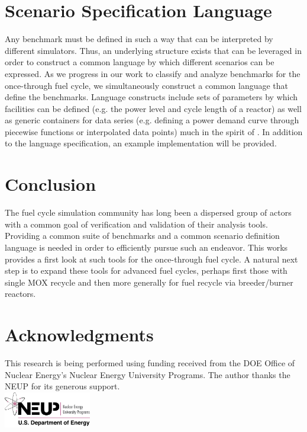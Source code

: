 \documentclass{anstrans}
\begin{document}
\section{Scenario Specification Language}
Any benchmark must be defined in such a way that can be interpreted by
different simulators. Thus, an underlying structure exists that can be
leveraged in order to construct a common language by which different
scenarios can be expressed. As we progress in our work to classify and
analyze benchmarks for the once-through fuel cycle, we simultaneously
construct a common language that define the benchmarks. Language 
constructs include sets of parameters by which facilities can be
defined (e.g. the power level and cycle length of a reactor) as well
as generic containers for data series (e.g. defining a power demand 
curve through piecewise functions or interpolated data points) much
in the spirit of \cite{mattoon_gneralized_2012}. In addition to the
language specification, an example implementation will be provided.

\section{Conclusion}
The fuel cycle simulation community has long been a dispersed group
of actors with a common goal of verification and validation of their
analysis tools. Providing a common suite of benchmarks and a common
scenario definition language is needed in order to efficiently pursue
such an endeavor. This works provides a first look at such tools for
the once-through fuel cycle. A natural next step is to expand these
tools for advanced fuel cycles, perhaps first those with single MOX
recycle and then more generally for fuel recycle via breeder/burner
reactors.

\section{Acknowledgments}
This research is being performed using funding received from the DOE
Office of Nuclear Energy's Nuclear Energy University Programs.  The
author thanks the NEUP for its generous support.\\
\includegraphics[width=1.5in]{neup_logo_large.jpg}


\end{document}
